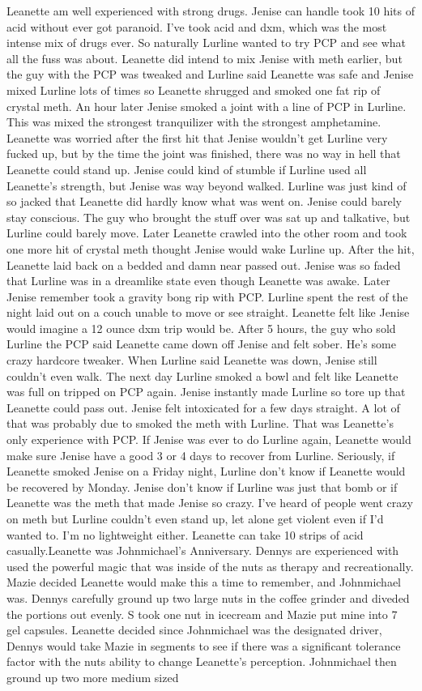 \documentclass[12pt]{book}
\begin{document}
Leanette am well experienced with strong drugs. Jenise can handle took 10 hits of acid without ever got paranoid. I've took acid and dxm, which was the most intense mix of drugs ever. So naturally Lurline wanted to try PCP and see what all the fuss was about. Leanette did intend to mix Jenise with meth earlier, but the guy with the PCP was tweaked and Lurline said Leanette was safe and Jenise mixed Lurline lots of times so Leanette shrugged and smoked one fat rip of crystal meth. An hour later Jenise smoked a joint with a line of PCP in Lurline. This was mixed the strongest tranquilizer with the strongest amphetamine. Leanette was worried after the first hit that Jenise wouldn't get Lurline very fucked up, but by the time the joint was finished, there was no way in hell that Leanette could stand up. Jenise could kind of stumble if Lurline used all Leanette's strength, but Jenise was way beyond walked. Lurline was just kind of so jacked that Leanette did hardly know what was went on. Jenise could barely stay conscious. The guy who brought the stuff over was sat up and talkative, but Lurline could barely move. Later Leanette crawled into the other room and took one more hit of crystal meth thought Jenise would wake Lurline up. After the hit, Leanette laid back on a bedded and damn near passed out. Jenise was so faded that Lurline was in a dreamlike state even though Leanette was awake. Later Jenise remember took a gravity bong rip with PCP. Lurline spent the rest of the night laid out on a couch unable to move or see straight. Leanette felt like Jenise would imagine a 12 ounce dxm trip would be. After 5 hours, the guy who sold Lurline the PCP said Leanette came down off Jenise and felt sober. He's some crazy hardcore tweaker. When Lurline said Leanette was down, Jenise still couldn't even walk. The next day Lurline smoked a bowl and felt like Leanette was full on tripped on PCP again. Jenise instantly made Lurline so tore up that Leanette could pass out. Jenise felt intoxicated for a few days straight. A lot of that was probably due to smoked the meth with Lurline. That was Leanette's only experience with PCP. If Jenise was ever to do Lurline again, Leanette would make sure Jenise have a good 3 or 4 days to recover from Lurline. Seriously, if Leanette smoked Jenise on a Friday night, Lurline don't know if Leanette would be recovered by Monday. Jenise don't know if Lurline was just that bomb or if Leanette was the meth that made Jenise so crazy. I've heard of people went crazy on meth but Lurline couldn't even stand up, let alone get violent even if I'd wanted to. I'm no lightweight either. Leanette can take 10 strips of acid casually.Leanette was Johnmichael's Anniversary. Dennys are experienced with used the powerful magic that was inside of the nuts as therapy and recreationally. Mazie decided Leanette would make this a time to remember, and Johnmichael was. Dennys carefully ground up two large nuts in the coffee grinder and diveded the portions out evenly. S took one nut in icecream and Mazie put mine into 7 gel capsules. Leanette decided since Johnmichael was the designated driver, Dennys would take Mazie in segments to see if there was a significant tolerance factor with the nuts ability to change Leanette's perception. Johnmichael then ground up two more medium sized 
\end{document}
